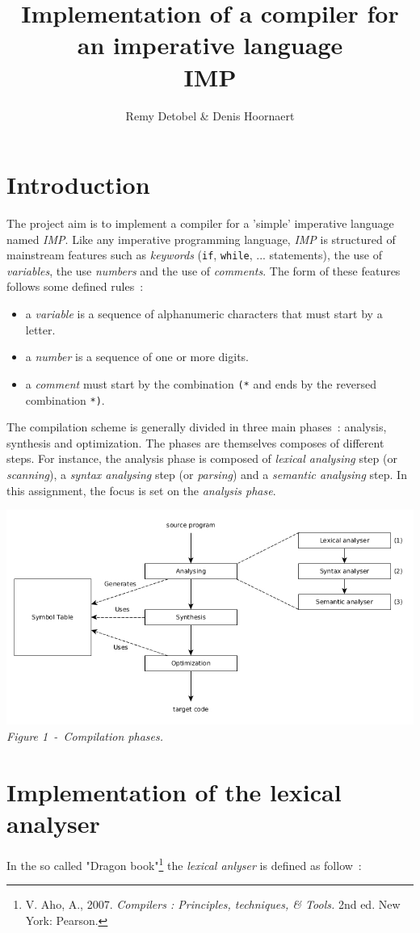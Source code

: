 \documentclass[a4paper,11pt]{article}
\title{Implementation of a compiler for an imperative language\\IMP}
\author{Remy Detobel \& Denis Hoornaert}
\begin{document}
\maketitle
\tableofcontents

\section{Introduction}

  The project aim is to implement a compiler for a 'simple' imperative language named \textit{IMP}. Like any imperative programming language, \textit{IMP} is structured of mainstream features such as \textit{keywords} (\verb|if|, \verb|while|, ... statements), the use of \textit{variables}, the use \textit{numbers} and the use of \textit{comments}.
  The form of these features follows some defined rules~:
  \begin{itemize}
    \item a \textit{variable} is a sequence of alphanumeric characters that must start by a letter.
    \item a \textit{number} is a sequence of one or more digits.
    \item a \textit{comment} must start by the combination \verb|(*| and ends by the reversed combination \verb|*)|.
  \end{itemize}
  The compilation scheme is generally divided in three main phases~: analysis, synthesis and optimization. The phases are themselves composes of different steps. For instance, the analysis phase is composed of \textit{lexical analysing} step (or \textit{scanning}), a \textit{syntax analysing} step (or \textit{parsing}) and a \textit{semantic analysing} step. In this assignment, the focus is set on the \textit{analysis phase}.
  \begin{center}
    \vfill
    \includegraphics[scale=0.5]{./img/phase_of_compiler.jpg}\\
    \textit{Figure 1~-~Compilation phases.}
    \vfill
  \end{center}
  
\section{Implementation of the lexical analyser}

  In the so called "Dragon book"\footnote{V. Aho, A., 2007. \textit{Compilers : Principles, techniques, \& Tools.} 2nd ed. New York: Pearson.} the \textit{lexical anlyser} is defined as follow~:
\end{document}
